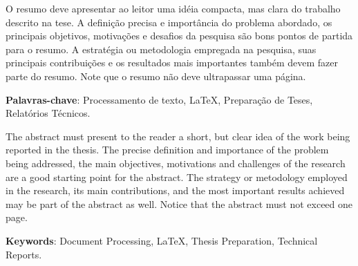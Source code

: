 %
%


O resumo deve apresentar ao leitor uma idéia compacta, mas clara do
trabalho descrito na tese. A definição precisa e importância do
problema abordado, os principais objetivos, motivações e desafios da
pesquisa são bons pontos de partida para o resumo. A estratégia ou
metodologia empregada na pesquisa, suas principais contribuições e os
resultados mais importantes também devem fazer parte do resumo. Note
que o resumo não deve ultrapassar uma página.

\vspace{1.5ex}

{\bf Palavras-chave}: Processamento de texto, \LaTeX,
Preparação de Teses, Relatórios Técnicos.
%
%


The abstract must present to the reader a short, but clear idea of the
work being reported in the thesis. The precise definition and
importance of the problem being addressed, the main objectives,
motivations and challenges of the research are a good starting point
for the abstract. The strategy or metodology employed in the research,
its main contributions, and the most important results achieved may be
part of the abstract as well. Notice that the
abstract must not exceed one page.

\vspace{1.5ex}

{\bf Keywords}: Document Processing, \LaTeX, Thesis Preparation,
Technical Reports.
